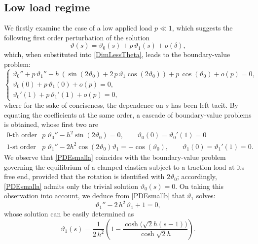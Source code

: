 \documentclass[oneside]{article}
\begin{document}
			
			\subsection{Low load regime}\label{lowload}
			
			We firstly examine the case of a low applied load $p\ll 1$, which suggests the following first order perturbation of the solution
			\begin{equation}
			\vartheta(s) = \vartheta_0(s)+p \,\vartheta_1(s)+o(\delta),
			\end{equation}
			which, when substituted into \eqref{DimLessTheta}, leads to the boundary-value problem:
			\begin{equation}
			\begin{cases}
			\vartheta_0''+p\, \vartheta_1'' - h\, (\sin(2\vartheta_0)+2\,p\,\vartheta_1\cos(2\vartheta_0)) + p \,\cos(\vartheta_0)+o(p) = 0,\\
			\vartheta_0(0)+p\,\vartheta_1(0)+o(p)=0,\\
			\vartheta_0'(1)+p\,\vartheta_1'(1)+o(p)=0,
			\end{cases}
			\label{ODElowload}
			\end{equation}
			where for the sake of conciseness, the dependence on $s$ has been left tacit.
			By equating the coefficients at the same order, a cascade of boundary-value problems is obtained, whose first two  are
			\begin{subequations}
				\begin{align}
				\text{0-th order in $p$} \qquad &\vartheta_0'' - h^2 \sin(2\vartheta_0) = 0,\qquad \vartheta_0(0)=\vartheta_0'(1)=0\label{PDEsmalla}
				\\
				\text{1-st order in $p$} \qquad & \vartheta_1'' - 2 h^2 \cos(2\vartheta_0) \vartheta_1 = - \cos(\vartheta_0),\qquad \vartheta_1(0)=\vartheta_1'(1)=0. \label{PDEsmallb}
				\end{align}
			\end{subequations}
			We observe that \eqref{PDEsmalla} coincides with the boundary-value problem governing the equilibrium of a clamped elastica subject to a traction load at its free end,  provided that the rotation is identified with $2\vartheta_0$; accordingly, \eqref{PDEsmalla} admits only the trivial solution $\vartheta_0(s)=0$.  On taking this observation into account, we deduce from \eqref{PDEsmallb} that $\vartheta_1$ solves:
			\begin{equation}\label{th1c1}
			\vartheta_1''-2\,h^2\, \vartheta_1+1=0,
			\end{equation}
			whose  solution  can be easily determined as
			\begin{equation}\label{sol1}
			\vartheta_1(s)=\frac{1}{2\,h^2}\left(1-\frac{\cosh\big(\sqrt{2}h(s-1)  \big)}{\cosh \sqrt{2}h}  \right).
			\end{equation}
			
\end{document}
